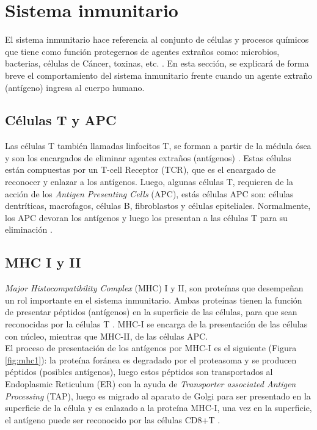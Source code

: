 \section{Sistema inmunitario}

El sistema inmunitario hace referencia al conjunto de células y procesos químicos que tiene como función protegernos de agentes extraños como: microbios, bacterias, células de Cáncer, toxinas, etc. \cite{marshall2018introduction}. En esta sección, se explicará de forma breve el comportamiento del sistema inmunitario frente cuando un agente extraño (antígeno) ingresa al cuerpo humano.

\subsection{Células T y APC}

Las células T también llamadas linfocitos T, se forman a partir de la médula ósea y son los encargados de eliminar agentes extraños (antígenos) \cite{NCIdictionary2022}. Estas células están compuestas por un T-cell Receptor (TCR), que es el encargado de reconocer y enlazar a los antígenos. Luego, algunas células T, requieren de la acción de los \textit{Antigen Presenting Cells} (APC), estás células APC son: células dentríticas, macrofagos, células B, fibroblastos y células epiteliales. Normalmente, los APC devoran los antígenos y luego los presentan a las células T para su eliminación  \citep{marshall2018introduction}.


\subsection{MHC I y II}

\textit{Major Histocompatibility Complex} (MHC) I y II, son proteínas que desempeñan un rol importante en el sistema inmunitario. Ambas proteínas tienen la función de presentar péptidos (antígenos) en la superficie de las células, para que sean reconocidas por la células T \citep{abualrous2021major}. MHC-I se encarga de la presentación de las células con núcleo, mientras que MHC-II, de las células APC. \\

El proceso de presentación de los antígenos por MHC-I es el siguiente (Figura \ref{fig:mhc1}): la proteína foránea es degradado por el proteasoma y se producen péptidos (posibles antígenos), luego estos péptidos son transportados al Endoplasmic Reticulum (ER) con la ayuda de \textit{Transporter associated Antigen Processing} (TAP), luego es migrado al aparato de Golgi para ser presentado en la superficie de la célula y es enlazado a la proteína MHC-I, una vez en la superficie, el antígeno puede ser reconocido por las células CD8+T \citep{zhang2019application}.




